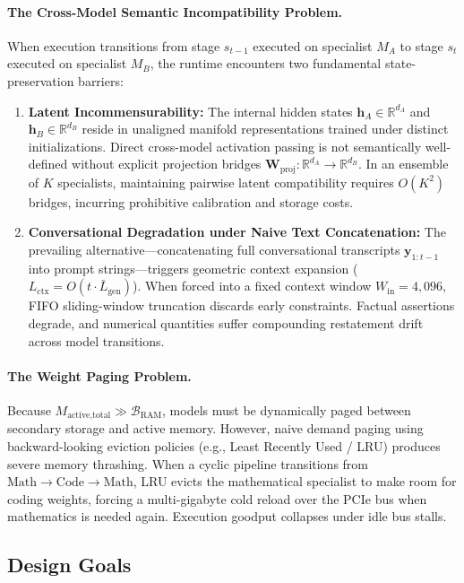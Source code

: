 \paragraph{The Cross-Model Semantic Incompatibility Problem.}
When execution transitions from stage $s_{t-1}$ executed on specialist $M_A$ to stage $s_t$ executed on specialist $M_B$, the runtime encounters two fundamental state-preservation barriers:
\begin{enumerate}
    \item \textbf{Latent Incommensurability:} The internal hidden states $\mathbf{h}_A \in \mathbb{R}^{d_A}$ and $\mathbf{h}_B \in \mathbb{R}^{d_B}$ reside in unaligned manifold representations trained under distinct initializations. Direct cross-model activation passing is not semantically well-defined without explicit projection bridges $\mathbf{W}_{\text{proj}}: \mathbb{R}^{d_A} \to \mathbb{R}^{d_B}$. In an ensemble of $K$ specialists, maintaining pairwise latent compatibility requires $O(K^2)$ bridges, incurring prohibitive calibration and storage costs.
    \item \textbf{Conversational Degradation under Naive Text Concatenation:} The prevailing alternative---concatenating full conversational transcripts $\mathbf{y}_{1:t-1}$ into prompt strings---triggers geometric context expansion ($L_{\text{ctx}} = O(t \cdot \bar{L}_{\text{gen}})$). When forced into a fixed context window $W_{\text{in}} = 4,096$, FIFO sliding-window truncation discards early constraints. Factual assertions degrade, and numerical quantities suffer compounding restatement drift across model transitions.
\end{enumerate}

\paragraph{The Weight Paging Problem.}
Because $M_{\text{active,total}} \gg \mathcal{B}_{\text{RAM}}$, models must be dynamically paged between secondary storage and active memory. However, naive demand paging using backward-looking eviction policies (e.g., Least Recently Used / LRU) produces severe memory thrashing. When a cyclic pipeline transitions from $\text{Math} \to \text{Code} \to \text{Math}$, LRU evicts the mathematical specialist to make room for coding weights, forcing a multi-gigabyte cold reload over the PCIe bus when mathematics is needed again. Execution goodput collapses under idle bus stalls.

\subsection{Design Goals}
\label{sec:design_goals}

